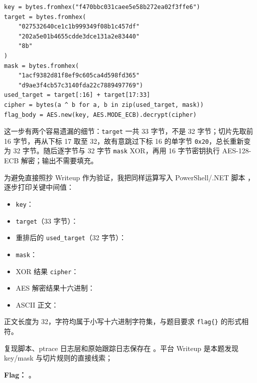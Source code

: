 \begin{verbatim}
key = bytes.fromhex("f470bbc031caee5e58b272ea02f3ffe6")
target = bytes.fromhex(
    "027532640ce1c1b999349f08b1c457df"
    "202a5e01b4655cdde3dce131a2e83440"
    "8b"
)
mask = bytes.fromhex(
    "1acf9382d81f8ef9c605ca4d598fd365"
    "d9ae3f4cb57c3140fda22c7889497769")
used_target = target[:16] + target[17:33]
cipher = bytes(a ^ b for a, b in zip(used_target, mask))
flag_body = AES.new(key, AES.MODE_ECB).decrypt(cipher)
\end{verbatim}

这一步有两个容易遗漏的细节：\texttt{target} 一共 33 字节，不是 32 字节；切片先取前 16 字节，再从下标 17 取至 32，故有意跳过下标 16 的单字节 \texttt{0x20}，总长重新变为 32 字节。随后逐字节与 32 字节 \texttt{mask} XOR，再用 16 字节密钥执行 AES-128-ECB 解密；输出不需要填充。

为避免直接照抄 Writeup 作为验证，我把同样运算写入 PowerShell/.NET 脚本 \texttt{}，逐步打印关键中间值：

\begin{itemize}
\tightlist
\item
  \texttt{key}：
\item
  \texttt{target}（33 字节）：
\item
  重排后的 \texttt{used\_target}（32 字节）：
\item
  \texttt{mask}：
\item
  XOR 结果 \texttt{cipher}：
\item
  AES 解密结果十六进制：
\item
  ASCII 正文：\texttt{}
\end{itemize}

正文长度为 32，字符均属于小写十六进制字符集，与题目要求 \texttt{flag\{\}} 的形式相符。

复现脚本、ptrace 日志层和原始跟踪日志保存在 \texttt{}。平台 Writeup 是本题发现 key/mask 与切片规则的直接线索；

\textbf{Flag：} \texttt{}。

